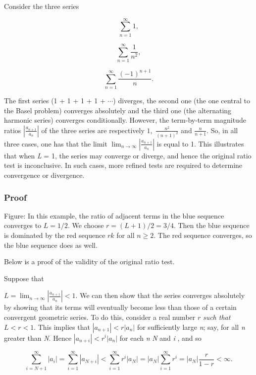 Consider the three series


\[
\sum _{n=1}^\infty 1,
\]


\[
\sum _{n=1}^\infty \frac{1}{n^2},
\]


\[
\sum _{n=1}^\infty \frac{(-1)^{n+1}}{n}.
\]


The first series (1 + 1 + 1 + 1 + $\cdots$) diverges, the second one (the one central to the Basel problem) converges absolutely and the third one (the alternating harmonic series) converges conditionally. However, the term-by-term magnitude ratios $\left|\frac{a _{n+1}}{a_n}\right|$ of the three series are respectively $1,$ $\frac{n^2}{(n+1)^2}$ and $\frac{n}{n+1}$. So, in all three cases, one has that the limit $\lim _{n\to\infty}\left|\frac{a _{n+1}}{a_n}\right|$ is equal to 1. This illustrates that when \textit{L} = 1, the series may converge or diverge, and hence the original ratio test is inconclusive. In such cases, more refined tests are required to determine convergence or divergence.


\subsubsection{Proof}
\label{sss:proo-028d}




Figure: In this example, the ratio of adjacent terms in the blue sequence converges to $L=1/2$. We choose $r = (L+1)/2 = 3/4$. Then the blue sequence is dominated by the red sequence $rk$ for all $n \geq 2$. The red sequence converges, so the blue sequence does as well.


Below is a proof of the validity of the original ratio test.


Suppose that

$L = \lim _{n\to\infty} \left| \frac{a _{n+1}}{a _{n}}\right| < 1$. We can then show that the series converges absolutely by showing that its terms will eventually become less than those of a certain convergent geometric series. To do this, consider a real number $r$ \textit{such that} $L < r < 1$. This implies that $|a _{n+1}| < r |a _{n}|$ for sufficiently large \textit{n}; say, for all \textit{n} greater than \textit{N}. Hence $|a _{n+i}| < r^i|a _{n}|$ for each \textit{n} \> \textit{N} and \textit{i} , and so


\[
\sum _{i=N+1}^{\infty}|a_i| = \sum _{i=1}^{\infty} \left |a _{N+i} \right | < \sum _{i=1}^{\infty}r^{i}|a _{N}| = |a _{N}| \sum _{i=1}^{\infty} r^{i} = |a _{N}|\frac{r}{1 - r} < \infty.
\]


